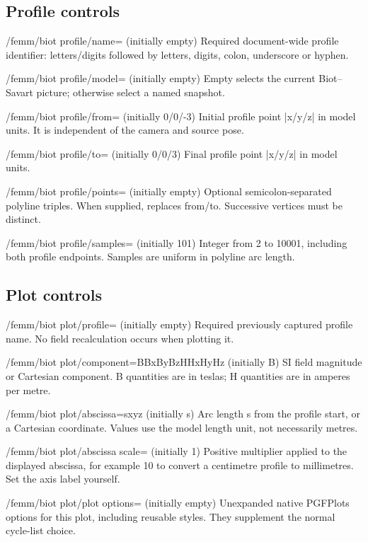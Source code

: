 \subsection{Profile controls}
\begin{key}{/femm/biot profile/name= (initially empty)}
Required document-wide profile identifier: letters/digits followed by letters, digits, colon, underscore or hyphen.
\end{key}
\begin{key}{/femm/biot profile/model= (initially empty)}
Empty selects the current Biot--Savart picture; otherwise select a named snapshot.
\end{key}
\begin{key}{/femm/biot profile/from= (initially 0/0/-3)}
Initial profile point |x/y/z| in model units. It is independent of the camera and source pose.
\end{key}
\begin{key}{/femm/biot profile/to= (initially 0/0/3)}
Final profile point |x/y/z| in model units.
\end{key}
\begin{key}{/femm/biot profile/points= (initially empty)}
Optional semicolon-separated polyline triples. When supplied, replaces from/to. Successive vertices must be distinct.
\end{key}
\begin{key}{/femm/biot profile/samples= (initially 101)}
Integer from 2 to 10001, including both profile endpoints. Samples are uniform in polyline arc length.
\end{key}
\subsection{Plot controls}
\begin{key}{/femm/biot plot/profile= (initially empty)}
Required previously captured profile name. No field recalculation occurs when plotting it.
\end{key}
\begin{key}{/femm/biot plot/component=B\textbar Bx\textbar By\textbar Bz\textbar H\textbar Hx\textbar Hy\textbar Hz (initially B)}
SI field magnitude or Cartesian component. B quantities are in teslas; H quantities are in amperes per metre.
\end{key}
\begin{key}{/femm/biot plot/abscissa=s\textbar x\textbar y\textbar z (initially s)}
Arc length s from the profile start, or a Cartesian coordinate. Values use the model length unit, not necessarily metres.
\end{key}
\begin{key}{/femm/biot plot/abscissa scale= (initially 1)}
Positive multiplier applied to the displayed abscissa, for example 10 to convert a centimetre profile to millimetres. Set the axis label yourself.
\end{key}
\begin{key}{/femm/biot plot/plot options= (initially empty)}
Unexpanded native PGFPlots options for this plot, including reusable styles. They supplement the normal cycle-list choice.
\end{key}
